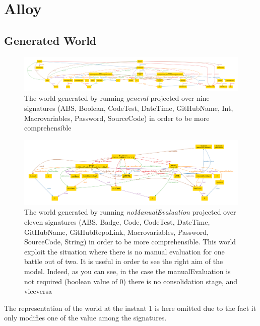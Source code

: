 \section{Alloy}
\lstset{
  language=alloy,
  basicstyle=\small\ttfamily,
  breaklines=true,
  showstringspaces=false
}


\subsection{Generated World}
\begin{figure}[h]
  \centering
  \includegraphics[width=1\linewidth]{RASD/4Alloy/res/general.pdf}
  \caption{The world generated by running \textit{general} projected over nine signatures (ABS, Boolean, CodeTest, DateTime, GitHubName, Int, Macrovariables, Password, SourceCode) in order to be more comprehensible}
\end{figure}

\begin{figure}[h]
  \centering
  \includegraphics[width=1\linewidth]{RASD/4Alloy/res/noManualEvaluation.pdf}
  \caption{The world generated by running \textit{noManualEvaluation} projected over eleven signatures (ABS, Badge, Code, CodeTest, DateTime, GitHubName, GitHubRepoLink, Macrovariables, Password, SourceCode, String) in order to be more comprehensible. This world exploit the situation where there is no manual evaluation for one battle out of two. It is useful in order to see the right aim of the model. Indeed, as you can see, in the case the manualEvaluation is not required (boolean value of 0) there is no consolidation stage, and viceversa}
\end{figure}

The representation of the world at the instant 1 is here omitted due to the fact it only modifies one of the value among the signatures.